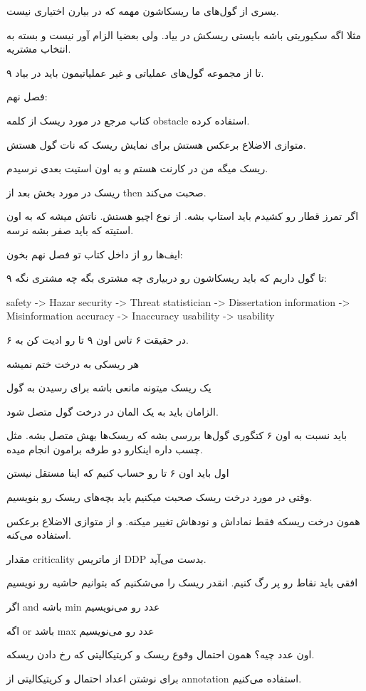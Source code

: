 یسری از گول‌های ما ریسکاشون مهمه که در بیارن اختیاری نیست.

مثلا اگه سکیوریتی باشه بایستی ریسکش در بیاد. ولی بعضیا الزام آور نیست و بسته به
انتخاب مشتریه.

۹ تا از مجموعه گول‌های عملیاتی و غیر عملیاتیمون باید در بیاد.

فصل نهم:

کتاب مرجع در مورد ریسک از کلمه obstacle استفاده کرده.

متوازی الاضلاع برعکس هستش برای نمایش ریسک که نات گول هستش.

ریسک میگه من در کارنت هستم و به اون استیت بعدی نرسیدم.

ریسک در مورد بخش بعد از then صحبت می‌کند.

اگر تمرز قطار رو کشیدم باید استاپ بشه. از نوع اچیو هستش. ناتش میشه که به اون
استیته که باید صفر بشه نرسه.

ایف‌ها رو از داخل کتاب تو فصل نهم بخون:

۹ تا گول داریم که باید ریسکاشون رو دربیاری چه مشتری بگه چه مشتری نگه:

safety -> Hazar
security -> Threat
statistician -> Dissertation
information -> Misinformation
accuracy -> Inaccuracy
usability -> usability

در حقیقت ۶ تاس اون ۹ تا رو ادیت کن به ۶.

هر ریسکی به درخت ختم نمیشه

یک ریسک میتونه مانعی باشه برای رسیدن به گول

الزامان باید به یک المان در درخت گول متصل شود.

باید نسبت به اون ۶ کتگوری گول‌ها بررسی بشه که ریسک‌ها بهش متصل بشه.
مثل چسب داره اینکارو دو طرفه برامون انجام میده.

اول باید اون ۶ تا رو حساب کنیم که اینا مستقل نیستن

وقتی در مورد درخت ریسک صحبت میکنیم باید بچه‌های ریسک رو بنویسیم.

همون درخت ریسکه فقط نماداش و نود‌هاش تغییر میکنه. و از متوازی الاضلاع برعکس
استفاده می‌کنه.

مقدار criticality از ماتریس DDP بدست می‌آید.

افقی باید نقاط رو پر رگ کنیم.
انقدر ریسک را می‌شکنیم که بتوانیم حاشیه رو نویسیم

اگر and باشه min عدد رو می‌نویسیم

اگه or باشد max عدد رو می‌نویسیم

اون عدد چیه؟ همون احتمال وقوع ریسک و کریتیکالیتی که رخ دادن ریسکه.

برای نوشتن اعداد احتمال و کریتیکالیتی از annotation استفاده می‌کنیم.

